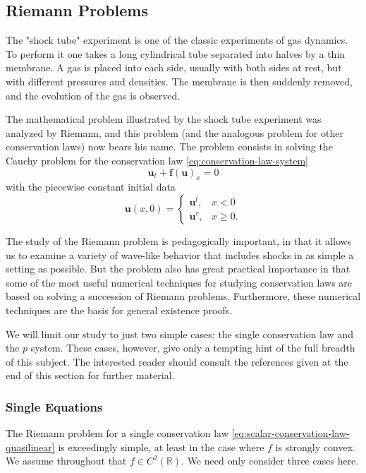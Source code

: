 \subsection{Riemann Problems}\label{sec:riemann-problems}

The "shock tube" experiment is one of the classic experiments of gas dynamics. To perform it one takes a long cylindrical tube separated into halves by a thin membrane. A gas is placed into each side, usually with both sides at rest, but with different pressures and densities. The membrane is then suddenly removed, and the evolution of the gas is observed.

The mathematical problem illustrated by the shock tube experiment was analyzed by Riemann, and this problem (and the analogous problem for other conservation laws) now bears his name. The problem consists in solving the Cauchy problem for the conservation law \eqref{eq:conservation-law-system}
\[
\bm{u}_t+\bm{f}(\bm{u})_x=0
\]
with the piecewise constant initial data
\begin{equation}\label{eq:riemann-piecewise-constant-data}
\bm{u}(x,0)=\begin{cases}\bm{u}^l,&x<0\\\bm{u}^r,&x\geq0.\end{cases}
\end{equation}


The study of the Riemann problem is pedagogically important, in that it allows us to examine a variety of wave-like behavior that includes shocks in as simple a setting as possible. But the problem also has great practical importance in that some of the most useful numerical techniques for studying conservation laws are based on solving a succession of Riemann problems. Furthermore, these numerical techniques are the basis for general existence proofs.

We will limit our study to just two simple cases: the single conservation law and the $p$ system. These cases, however, give only a tempting hint of the full breadth of this subject. The interested reader should consult the references given at the end of this section for further material.

\subsubsection{Single Equations}\label{subsec:scalar-riemann-problems}

The Riemann problem for a single conservation law \eqref{eq:scalar-conservation-law-quasilinear} is exceedingly simple, at least in the case where $f$ is strongly convex. We assume throughout that $f\in C^2(\mathbb{R})$. We need only consider three cases here.


